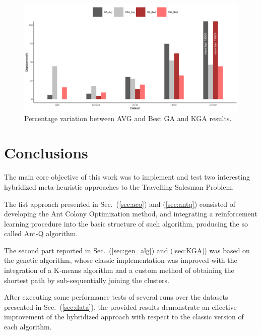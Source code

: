 \documentclass[10pt]{article}
\begin{document}
\begin{figure}
\centering \includegraphics[scale=0.5]{figs/GA_KGA_avg_best.png}
\caption{\label{fig:GA_KGA_performance} Percentage variation between AVG and Best GA and KGA results.}
\end{figure}

\section{Conclusions}

The main core objective of this work was to implement and test two interesting hybridized meta-heuristic approaches to the Travelling Salesman Problem.

The fist approach presented in Sec.~(\ref{sec:aco}) and (\ref{sec:antq}) consisted of developing the Ant Colony Optimization method, and integrating a reinforcement learning procedure into the basic structure of such algorithm, producing the so called Ant-Q algorithm.

The second part reported in Sec.~(\ref{sec:gen_alg}) and (\ref{sec:KGA}) was based on the genetic algorithm, whose classic implementation was improved with the integration of a K-means algorithm and a custom method of obtaining the shortest path by sub-sequentially joining the clusters.

After executing some performance tests of several runs over the datasets presented in Sec.~(\ref{sec:data}), the provided results demonstrate an effective improvement of the hybridized approach with respect to the classic version of each algorithm.
\end{document}
